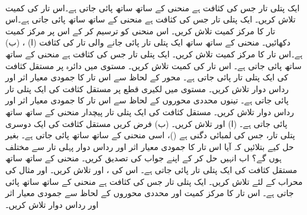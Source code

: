 \\
%
ایک پتلی تار جس کی کثافت  ہے منحنی  کے ساتھ ساتھ پائی جاتی ہے۔اس تار کی کمیت تلاش کریں۔
%
ایک پتلی  تار جس کی کثافت  ہے منحنی  کے ساتھ ساتھ پائی جاتی ہے۔اس تار کا مرکز کمیت تلاش کریں۔ اس منحنی کو ترسیم کر کے اس پر مرکز کمیت دکھائیں۔
%
منحنی  کے ساتھ ساتھ  ایک پتلی تار پائی جانے والی تار کی کثافت (ا) ، (ب)  ہے۔اس تار کا مرکز کمیت تلاش کریں۔
%
ایک پتلی تار جس کی کثافت  ہے منحنی
  کے ساتھ ساتھ پائی جاتی ہے۔ اس تار کی کمیت تلاش کریں۔
%
مستوی  میں دائرہ  پر مستقل کثافت  کی ایک پتلی تار پائی جاتی ہے۔ محور  کے لحاظ سے اس تار کا جمودی معیار اثر اور رداس  دوار تلاش کریں۔
%
مستوی  میں لکیری قطع  پر مستقل کثافت  کی ایک پتلی تار پائی جاتی ہے۔ تینوں محددی محوروں  کے لحاظ سے اس تار کا جمودی معیار اثر اور رداس  دوار تلاش کریں۔
%
مستقل کثافت  کی ایک پتلی تار پیچدار منحنی  کے ساتھ ساتھ پائی جاتی ہے۔ (ا)  اور  تلاش کریں۔ (ب) فرض کریں مستقل کثافت  کی ایک دوسری پتلی تار، جس کی لمبائی دگنی ہے ()، اسی منحنی  کے ساتھ ساتھ پائی جاتی ہے۔ بغیر حل کیے بتلائیں کہ آیا اس تار کا جمودی معیار اثر اور رداس دوار پہلی تار سے مختلف ہوں گے؟  اب انہیں حل کر کے اپنے جواب کی تصدیق کریں۔
%
منحنی  کے ساتھ ساتھ مستقل کثافت  کی ایک پتلی تار  پائی جاتی ہے۔ اس کی ،  اور  تلاش کریں۔
%
 اور  مثال  کی محراب کے لئے تلاش کریں۔
%
ایک پتلی تار جس کی کثافت  ہے منحنی  کے ساتھ ساتھ پائی جاتی ہے۔ اس تار کا مرکز کمیت اور محددی محوروں کے لحاظ سے جمودی معیار اثر اور رداس دوار تلاش کریں۔
\\
